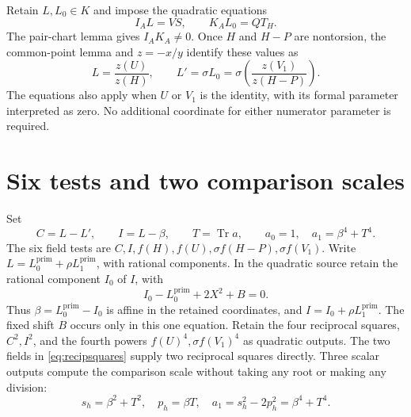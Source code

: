 \documentclass[11pt,a4paper]{article}
\DeclareMathOperator{\Tr}{Tr}\DeclareMathOperator{\Nm}{N}
\begin{document}
Retain $L,L_0\in K$ and impose the quadratic equations
\begin{equation}\label{eq:ratios}
                         I_AL=VS,\qquad K_AL_0=QT_H.
\end{equation}
The pair-chart lemma gives $I_AK_A\ne0$. Once $H$ and $H-P$ are
nontorsion, the common-point lemma and $z=-x/y$ identify these values as
\[
 L=\frac{z(U)}{z(H)},\qquad
 L'=\sigma L_0=\sigma\!\left(\frac{z(V_1)}{z(H-P)}\right).
\]
The equations also apply when $U$ or $V_1$ is the identity, with its
formal parameter interpreted as zero. No additional coordinate for
either numerator parameter is required.

\section{Six tests and two comparison scales}

Set
\[
 C=L-L',\qquad I=L-\beta,\qquad T=\Tr a,
 \qquad a_0=1,\quad a_1=\beta^4+T^4.
\]
The six field tests are $C,I,f(H),f(U),\sigma f(H-P),\sigma f(V_1)$.
Write $L=L_0^{\mathrm{prim}}+\rho L_1^{\mathrm{prim}}$, with rational components.
In the quadratic source retain the rational component $I_0$ of $I$, with
\[
                  I_0-L_0^{\mathrm{prim}}+2X^2+B=0.
\]
Thus $\beta=L_0^{\mathrm{prim}}-I_0$ is affine in the retained
coordinates, and $I=I_0+\rho L_1^{\mathrm{prim}}$.
The fixed shift $B$ occurs only in this one equation.
Retain the four reciprocal squares, $C^2,I^2$, and the fourth powers
$f(U)^4,\sigma f(V_1)^4$ as quadratic outputs. The two fields in
\eqref{eq:recipsquares} supply two reciprocal squares directly.
Three scalar outputs compute the comparison scale without taking any
root or making any division:
\[
 s_h=\beta^2+T^2,\quad p_h=\beta T,\quad
 a_1=s_h^2-2p_h^2=\beta^4+T^4.
\]
\end{document}
